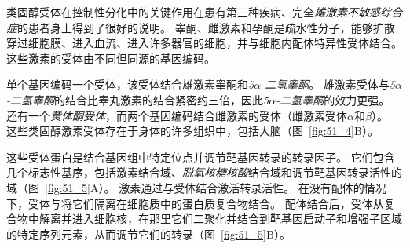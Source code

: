 类固醇受体在控制性分化中的关键作用在患有第三种疾病、完全\textit{雄激素不敏感综合症}的患者身上得到了很好的说明。
睾酮、雌激素和孕酮是疏水性分子，能够扩散穿过细胞膜、进入血流、进入许多器官的细胞，并与细胞内配体特异性受体结合。
这些激素的受体由不同但同源的基因编码。


单个基因编码一个受体，该受体结合雄激素睾酮和\textit{5$\alpha$-二氢睾酮}。
雄激素受体与\textit{5$\alpha$-二氢睾酮}的结合比睾丸激素的结合紧密约三倍，因此\textit{5$\alpha$-二氢睾酮}的效力更强。
还有一个\textit{黄体酮受体}，而两个基因编码结合雌激素的受体（雌激素受体$\alpha$和$\beta$）。
这些类固醇激素受体存在于身体的许多组织中，包括大脑（图~\ref{fig:51_4}B）。


这些受体蛋白是结合基因组中特定位点并调节靶基因转录的转录因子。
它们包含几个标志性基序，包括激素结合域、\textit{脱氧核糖核酸}结合域和调节靶基因转录活性的域（图~\ref{fig:51_5}A）。
激素通过与受体结合激活转录活性。
在没有配体的情况下，受体与将它们隔离在细胞质中的蛋白质复合物结合。
配体结合后，受体从复合物中解离并进入细胞核，在那里它们二聚化并结合到靶基因启动子和增强子区域的特定序列元素，从而调节它们的转录（图~\ref{fig:51_5}B）。



